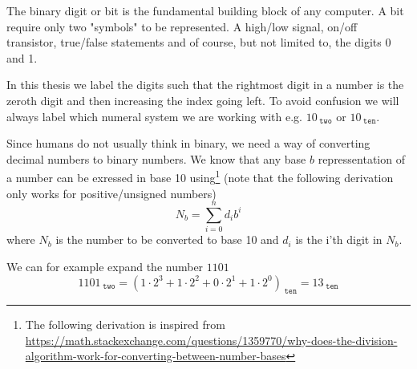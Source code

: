     The binary digit or bit is the fundamental building block of any computer. A bit require only two "symbols" to be represented. A high/low signal, on/off transistor, true/false statements and of course, but not limited to, the digits 0 and 1.
    
    In this thesis we label the digits such that the rightmost digit in a number is the zeroth digit and then increasing the index going left. To avoid confusion we will always label which numeral system we are working with e.g. $10_{\;\texttt{two}}$ or $10_{\;\texttt{ten}}$.
    
    Since humans do not usually think in binary, we need a way of converting decimal numbers to binary numbers. We know that any base $b$ repressentation of a number can be exressed in base 10 using\footnote{The following derivation is inspired from \\\url{https://math.stackexchange.com/questions/1359770/why-does-the-division-algorithm-work-for-converting-between-number-bases}} (note that the following derivation only works for positive/unsigned numbers) 
    \begin{equation}\label{Eq:baseXToDecimal}
        N_b = \sum_{i=0}^{n} d_i b^i
    \end{equation}
    where $N_b$ is the number to be converted to base 10 and $d_i$ is the i'th digit in $N_b$. 
   
    We can for example expand the number $1101$
    \begin{equation}\label{Eq:bintodecimal}
        1101_{\;\texttt{two}} = (1 \cdot 2^3 + 1 \cdot 2^2 + 0\cdot 2^1 + 1\cdot 2^0)_{\;\texttt{ten}} = 13_{\;\texttt{ten}}
    \end{equation}
    
